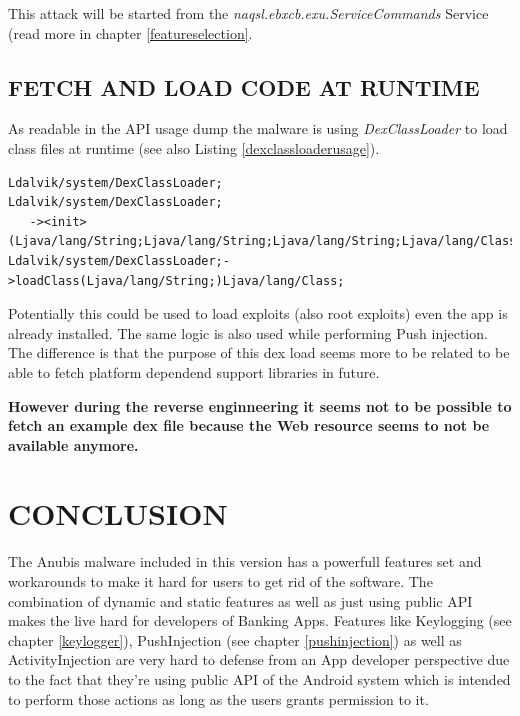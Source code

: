 \documentclass[10pt,titlepage]{article}
\begin{document}
This attack will be started from the \textit{naqsl.ebxcb.exu.ServiceCommands} Service (read more in chapter \ref{featureselection}.

            
\newpage
\subsection{FETCH AND LOAD CODE AT RUNTIME}
As readable in the API usage dump the malware is using \textit{DexClassLoader} to load class files at runtime (see also Listing \ref{dexclassloaderusage}).


\begin{lstlisting}[label=dexclassloaderusage,caption=The malware is using \textit{dalvik.system.DexClassLoader} and is able to load code at runtime for example from a Web resource.,frame=tb]
Ldalvik/system/DexClassLoader;
Ldalvik/system/DexClassLoader;
   -><init>(Ljava/lang/String;Ljava/lang/String;Ljava/lang/String;Ljava/lang/ClassLoader;)
Ldalvik/system/DexClassLoader;->loadClass(Ljava/lang/String;)Ljava/lang/Class;
\end{lstlisting}

Potentially this could be used to load exploits (also root exploits) even the app is already installed. The same logic is also used while performing Push injection. The difference is that the purpose of this dex load seems more to be related to be able to fetch platform dependend support libraries in future.

\textbf{However during the reverse enginneering it seems not to be possible to fetch an example dex file because the Web resource seems to not be available anymore.}




\section{CONCLUSION}
The Anubis malware included in this version has a powerfull features set and workarounds to make it hard for users to get rid of the software. The combination of dynamic and static features as well as just using public API makes the live hard for developers of Banking Apps. Features like Keylogging (see chapter \ref{keylogger}), PushInjection (see chapter \ref{pushinjection}) as well as ActivityInjection are very hard to defense from an App developer perspective due to the fact that they're using public API of the Android system which is intended to perform those actions as long as the users grants permission to it.
\end{document}
